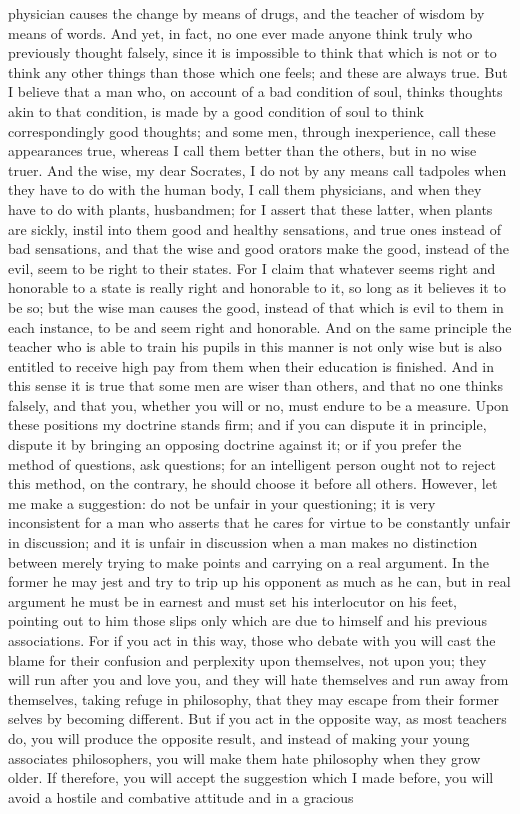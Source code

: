 \documentclass[letterpaper,12pt]{article}
\newcommand{\stephpag}[1]{\marginnote{\small\itshape\fontfamily{ppl}\selectfont #1}}
\begin{document}
\begin{drama}
physician causes the change by means of drugs, and the teacher of wisdom by means of words. And yet, in fact, no one ever made anyone think truly who previously thought falsely, since it is impossible to think that which is not or to think any other things than those which one feels; and these are always true. But I believe that a man who, on account of a bad condition of soul, \stephpag{b} thinks thoughts akin to that condition, is made by a good condition of soul to think correspondingly good thoughts; and some men, through inexperience, call these appearances true, whereas I call them better than the others, but in no wise truer. And the wise, my dear Socrates, I do not by any means call tadpoles when they have to do with the human body, I call them physicians, and when they have to do with plants, husbandmen; for I assert that these latter, when plants are sickly, instil into them good and healthy sensations, \stephpag{c} and true ones instead of bad sensations, and that the wise and good orators make the good, instead of the evil, seem to be right to their states. For I claim that whatever seems right and honorable to a state is really right and honorable to it, so long as it believes it to be so; but the wise man causes the good, instead of that which is evil to them in each instance, to be and seem right and honorable. And on the same principle the teacher who is able to train his pupils in this manner is not only wise but is also \stephpag{d} entitled to receive high pay from them when their education is finished. And in this sense it is true that some men are wiser than others, and that no one thinks falsely, and that you, whether you will or no, must endure to be a measure. Upon these positions my doctrine stands firm; and if you can dispute it in principle, dispute it by bringing an opposing doctrine against it; or if you prefer the method of questions, ask questions; for an intelligent person ought not to reject this method, on the contrary, he should choose it before all others. However, let me make a suggestion: do not be unfair in your questioning; \stephpag{e} it is very inconsistent for a man who asserts that he cares for virtue to be constantly unfair in discussion; and it is unfair in discussion when a man makes no distinction between merely trying to make points and carrying on a real argument. In the former he may jest and try to trip up his opponent as much as he can, but in real argument he must be in earnest and must set his interlocutor on his feet, pointing out to him those slips only which are due to himself and \stephpag{168 a} his previous associations. For if you act in this way, those who debate with you will cast the blame for their confusion and perplexity upon themselves, not upon you; they will run after you and love you, and they will hate themselves and run away from themselves, taking refuge in philosophy, that they may escape from their former selves by becoming different. But if you act in the opposite way, as most teachers do, you will produce the opposite result, and instead of making your young associates philosophers, you will make them hate philosophy \stephpag{b} when they grow older. If therefore, you will accept the suggestion which I made before, you will avoid a hostile and combative attitude and in a gracious 
\end{drama}
\end{document}
